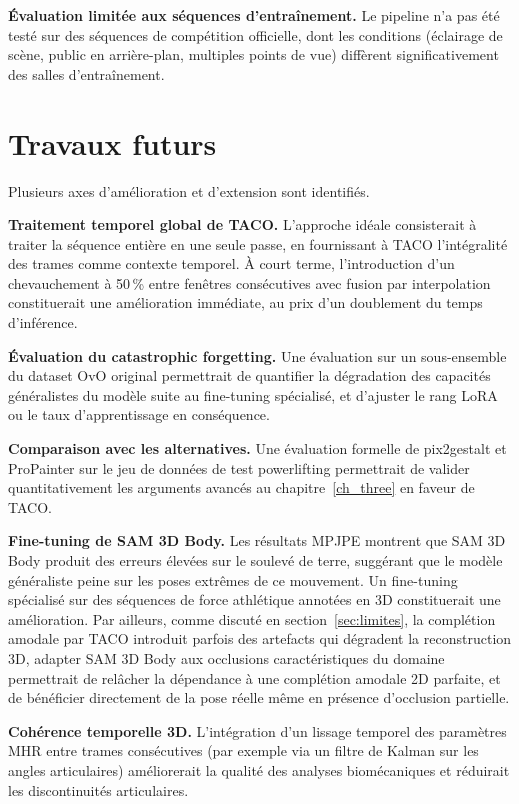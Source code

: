 \textbf{Évaluation limitée aux séquences d'entraînement.} Le pipeline n'a pas été testé sur des séquences de compétition officielle, dont les conditions (éclairage de scène, public en arrière-plan, multiples points de vue) diffèrent significativement des salles d'entraînement.

\section{Travaux futurs}

Plusieurs axes d'amélioration et d'extension sont identifiés.

\textbf{Traitement temporel global de TACO.} L'approche idéale consisterait à traiter la séquence entière en une seule passe, en fournissant à TACO l'intégralité des trames comme contexte temporel. À court terme, l'introduction d'un chevauchement à 50\,\% entre fenêtres consécutives avec fusion par interpolation constituerait une amélioration immédiate, au prix d'un doublement du temps d'inférence.

\textbf{Évaluation du catastrophic forgetting.} Une évaluation sur un sous-ensemble du dataset OvO original permettrait de quantifier la dégradation des capacités généralistes du modèle suite au fine-tuning spécialisé, et d'ajuster le rang LoRA ou le taux d'apprentissage en conséquence.

\textbf{Comparaison avec les alternatives.} Une évaluation formelle de pix2gestalt et ProPainter sur le jeu de données de test powerlifting permettrait de valider quantitativement les arguments avancés au chapitre~\ref{ch_three} en faveur de TACO.

\textbf{Fine-tuning de SAM 3D Body.} Les résultats MPJPE montrent que SAM 3D Body produit des erreurs élevées sur le soulevé de terre, suggérant que le modèle généraliste peine sur les poses extrêmes de ce mouvement. Un fine-tuning spécialisé sur des séquences de force athlétique annotées en 3D constituerait une amélioration. Par ailleurs, comme discuté en section~\ref{sec:limites}, la complétion amodale par TACO introduit parfois des artefacts qui dégradent la reconstruction 3D, adapter SAM 3D Body aux occlusions caractéristiques du domaine permettrait de relâcher la dépendance à une complétion amodale 2D parfaite, et de bénéficier directement de la pose réelle même en présence d'occlusion partielle.

\textbf{Cohérence temporelle 3D.} L'intégration d'un lissage temporel des paramètres MHR entre trames consécutives (par exemple via un filtre de Kalman sur les angles articulaires) améliorerait la qualité des analyses biomécaniques et réduirait les discontinuités articulaires.

